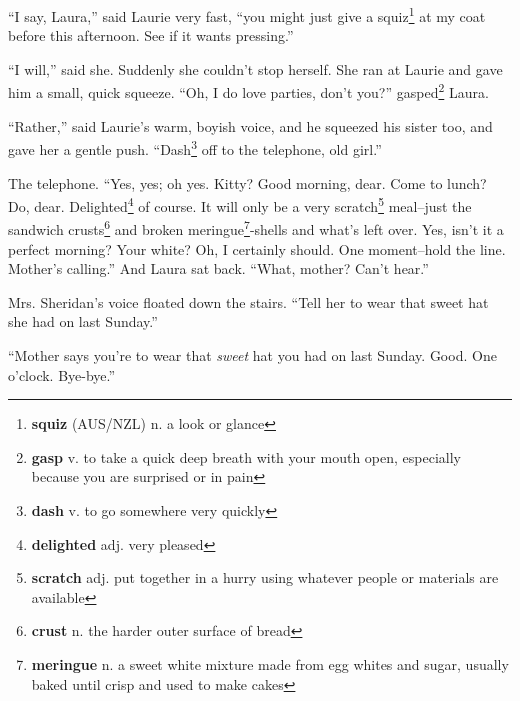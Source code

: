 ``I say, Laura,'' said Laurie very fast, ``you might just give a squiz\footnote{\textbf{squiz} (AUS/NZL) n. a look or glance} at my coat before this afternoon. See if it wants pressing.''

``I will,'' said she. Suddenly she couldn't stop herself. She ran at Laurie and gave him a small, quick squeeze. ``Oh, I do love parties, don't you?'' gasped\footnote{\textbf{gasp} v. to take a quick deep breath with your mouth open, especially because you are surprised or in pain} Laura.

``Rather,'' said Laurie's warm, boyish voice, and he squeezed his sister too, and gave her a gentle push. ``Dash\footnote{\textbf{dash} v. to go somewhere very quickly} off to the telephone, old girl.''

The telephone. ``Yes, yes; oh yes. Kitty? Good morning, dear. Come to lunch? Do, dear. Delighted\footnote{\textbf{delighted} adj. very pleased} of course. It will only be a very scratch\footnote{\textbf{scratch} adj. put together in a hurry using whatever people or materials are available} meal--just the sandwich crusts\footnote{\textbf{crust} n. the harder outer surface of bread} and broken meringue\footnote{\textbf{meringue} n. a sweet white mixture made from egg whites and sugar, usually baked until crisp and used to make cakes}-shells and what's left over. Yes, isn't it a perfect morning? Your white? Oh, I certainly should. One moment--hold the line. Mother's calling.'' And Laura sat back. ``What, mother? Can't hear.''

Mrs. Sheridan's voice floated down the stairs. ``Tell her to wear that sweet hat she had on last Sunday.''

``Mother says you're to wear that \textit{sweet} hat you had on last Sunday. Good. One o'clock. Bye-bye.''

